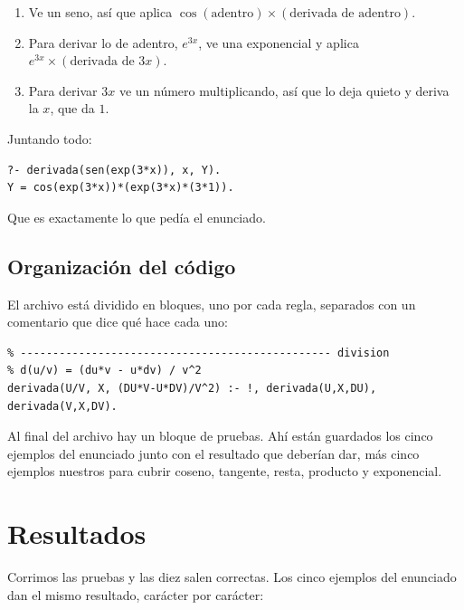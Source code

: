 \documentclass[11pt,letterpaper]{article}
\begin{document}
\begin{enumerate}[noitemsep]
  \item Ve un seno, así que aplica $\cos(\text{adentro}) \times (\text{derivada de adentro})$.
  \item Para derivar lo de adentro, $e^{3x}$, ve una exponencial y aplica
        $e^{3x} \times (\text{derivada de } 3x)$.
  \item Para derivar $3x$ ve un número multiplicando, así que lo deja quieto y
        deriva la $x$, que da $1$.
\end{enumerate}

Juntando todo:

\begin{lstlisting}
?- derivada(sen(exp(3*x)), x, Y).
Y = cos(exp(3*x))*(exp(3*x)*(3*1)).
\end{lstlisting}

Que es exactamente lo que pedía el enunciado.

\subsection{Organización del código}

El archivo está dividido en bloques, uno por cada regla, separados con un
comentario que dice qué hace cada uno:

\begin{lstlisting}
% ------------------------------------------------ division
% d(u/v) = (du*v - u*dv) / v^2
derivada(U/V, X, (DU*V-U*DV)/V^2) :- !, derivada(U,X,DU), derivada(V,X,DV).
\end{lstlisting}

Al final del archivo hay un bloque de pruebas. Ahí están guardados los cinco
ejemplos del enunciado junto con el resultado que deberían dar, más cinco
ejemplos nuestros para cubrir coseno, tangente, resta, producto y exponencial.

\section{Resultados}

Corrimos las pruebas y las diez salen correctas. Los cinco ejemplos del
enunciado dan el mismo resultado, carácter por carácter:
\end{document}
